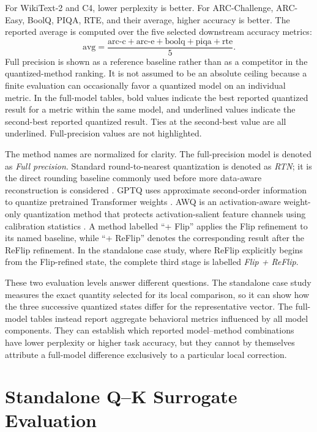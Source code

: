 \documentclass[../main.tex]{subfiles}
\begin{document}
For WikiText-2 and C4, lower perplexity is better. For ARC-Challenge, ARC-Easy, BoolQ, PIQA, RTE, and their average, higher accuracy is better. The reported average is computed over the five selected downstream accuracy metrics:
\[
\mathrm{avg}=\frac{\mathrm{arc\mbox{-}c}+\mathrm{arc\mbox{-}e}+\mathrm{boolq}+\mathrm{piqa}+\mathrm{rte}}{5}.
\]
Full precision is shown as a reference baseline rather than as a competitor in the quantized-method ranking. It is not assumed to be an absolute ceiling because a finite evaluation can occasionally favor a quantized model on an individual metric. In the full-model tables, bold values indicate the best reported quantized result for a metric within the same model, and underlined values indicate the second-best reported quantized result. Ties at the second-best value are all underlined. Full-precision values are not highlighted.

The method names are normalized for clarity. The full-precision model is denoted as \textit{Full precision}. Standard round-to-nearest quantization is denoted as \textit{RTN}; it is the direct rounding baseline commonly used before more data-aware reconstruction is considered \cite{gholami2021survey,jacob2018quantization,nagel2020adaround}. GPTQ uses approximate second-order information to quantize pretrained Transformer weights \cite{frantar2022gptq}. AWQ is an activation-aware weight-only quantization method that protects activation-salient feature channels using calibration statistics \cite{lin2023awq}. A method labelled ``+ Flip'' applies the Flip refinement to its named baseline, while ``+ ReFlip'' denotes the corresponding result after the ReFlip refinement. In the standalone case study, where ReFlip explicitly begins from the Flip-refined state, the complete third stage is labelled \textit{Flip + ReFlip}.

These two evaluation levels answer different questions. The standalone case study measures the exact quantity selected for its local comparison, so it can show how the three successive quantized states differ for the representative vector. The full-model tables instead report aggregate behavioral metrics influenced by all model components. They can establish which reported model--method combinations have lower perplexity or higher task accuracy, but they cannot by themselves attribute a full-model difference exclusively to a particular local correction.

\section{Standalone Q--K Surrogate Evaluation}
\end{document}
